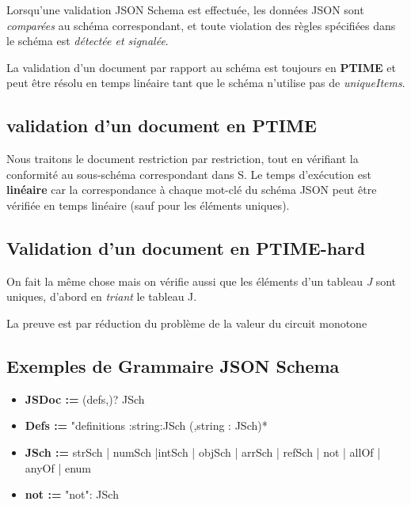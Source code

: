        Lorsqu'une validation JSON Schema est effectuée, les données JSON sont \textit{comparées} au schéma correspondant, et toute violation des règles spécifiées dans le schéma est \textit{détectée et signalée}. 


        La validation d'un document par rapport au schéma est toujours en \textbf{PTIME} et peut être résolu en temps linéaire tant que le schéma n'utilise pas de \textit{uniqueItems}.

            \subsection{validation d'un document en PTIME}
            Nous traitons le document restriction par restriction, tout en vérifiant la conformité au sous-schéma correspondant dans S.
            Le temps d’exécution est \textbf{linéaire} car la correspondance à chaque mot-clé du schéma JSON peut être vérifiée en temps linéaire (sauf pour les éléments uniques).
            
            \subsection{Validation d'un document en PTIME-hard}
            On fait la même chose mais on vérifie aussi que les éléments d'un tableau \textit{J} sont uniques, d'abord en \textit{triant} le tableau J.

            La preuve est par réduction du problème de la valeur du circuit monotone
            \subsection*{Exemples de Grammaire JSON Schema}
                
                
            \begin{itemize}
                \item [\textbullet]\textbf{JSDoc :=} {(defs,)? JSch}
                \item [\textbullet]\textbf{Defs :=}         "definitions :{string:{JSch}
                    (,string : {JSch})*
                }
                \item [\textbullet]\textbf{JSch :=} strSch | numSch |intSch | objSch | arrSch | refSch | not | allOf | anyOf | enum
                \item [\textbullet]\textbf{ not :=} "not": {JSch}
            \end{itemize}
            
            

